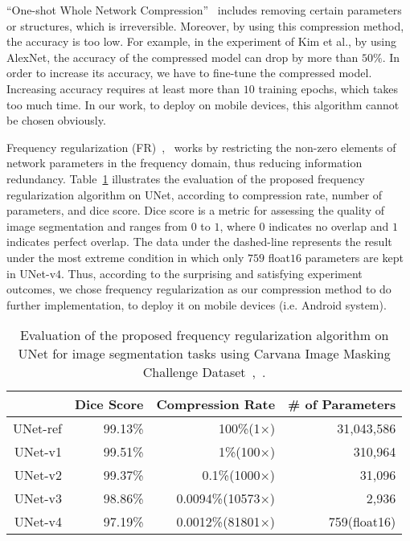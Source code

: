 \documentclass[runningheads]{llncs}
\begin{document}
``One-shot Whole Network Compression''~\cite{kim2016oneshot} includes removing certain parameters or structures, which is irreversible. Moreover, by using this compression method, the accuracy is too low. For example, in the experiment of Kim et al., by using AlexNet, the accuracy of the compressed model can drop by more than $50\%$. In order to increase its accuracy, we have to fine-tune the compressed model. Increasing accuracy requires at least more than $10$ training epochs, which takes too much time. In our work, to deploy on mobile devices, this algorithm cannot be chosen obviously. 


Frequency regularization (FR)~\cite{zhao2023fr},~\cite{fr_repo} works by restricting the non-zero elements of network parameters in the frequency domain, thus reducing information redundancy. Table~\ref{table:fr_unet} illustrates the evaluation of the proposed frequency regularization algorithm on UNet, according to compression rate, number of parameters, and dice score. Dice score is a metric for assessing the quality of image segmentation and ranges from $0$ to $1$, where $0$ indicates no overlap and $1$ indicates perfect overlap. The data under the dashed-line represents the result under the most extreme condition in which only $759$ float$16$ parameters are kept in UNet-v$4$. Thus, according to the surprising and satisfying experiment outcomes, we chose frequency regularization as our compression method to do further implementation, to deploy it on mobile devices (i.e. Android system).

\begin{table}[H]
	\caption{Evaluation of the proposed frequency regularization algorithm on UNet for image segmentation tasks using Carvana Image Masking Challenge Dataset~\cite{zhao2023fr},~\cite{brian2017carvanadataset}.} 
	\label{table:fr_unet}
	\small
	\centering
	\begin{tabular}{rrrr}
		\toprule
		&Dice Score&Compression Rate&\# of Parameters\\ 
		\midrule\midrule
		UNet-ref&99.13\%&100\%(1×)&31,043,586\\
		UNet-v1&99.51\%&1\%(100×)&310,964\\
		UNet-v2&99.37\%&0.1\%(1000×)&31,096\\
		UNet-v3&98.86\%&0.0094\%(10573×)&2,936\\
		\cdashline{1-4}
		UNet-v4&97.19\%&0.0012\%(81801×)&759(float16)\\
		\bottomrule
	\end{tabular}
\end{table}
\end{document}
